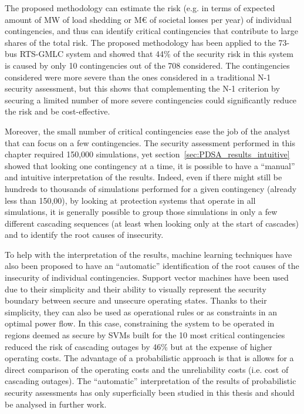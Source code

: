 The proposed methodology can estimate the risk (e.g. in terms of expected amount of MW of load shedding or M€ of societal losses per year) of individual contingencies, and thus can identify critical contingencies that contribute to large shares of the total risk. The proposed methodology has been applied to the 73-bus RTS-GMLC system and showed that 44\% of the security risk in this system is caused by only 10 contingencies out of the 708 considered. The contingencies considered were more severe than the ones considered in a traditional N-1 security assessment, but this shows that complementing the N-1 criterion by securing a limited number of more severe contingencies could significantly reduce the risk and be cost-effective.

Moreover, the small number of critical contingencies ease the job of the analyst that can focus on a few contingencies. The security assessment performed in this chapter required 150,000 simulations, yet section~\ref{sec:PDSA_results_intuitive} showed that looking one contingency at a time, it is possible to have a ``manual'' and intuitive interpretation of the results. Indeed, even if there might still be hundreds to thousands of simulations performed for a given contingency (already less than 150,00), by looking at protection systems that operate in all simulations, it is generally possible to group those simulations in only a few different cascading sequences (at least when looking only at the start of cascades) and to identify the root causes of insecurity.

To help with the interpretation of the results, machine learning techniques have also been proposed to have an ``automatic'' identification of the root causes of the insecurity of individual contingencies. Support vector machines have been used due to their simplicity and their ability to visually represent the security boundary between secure and unsecure operating states. Thanks to their simplicity, they can also be used as operational rules or as constraints in an optimal power flow. In this case, constraining the system to be operated in regions deemed as secure by SVMs built for the 10 most critical contingencies reduced the risk of cascading outages by 46\% but at the expense of higher operating costs. The advantage of a probabilistic approach is that is allows for a direct comparison of the operating costs and the unreliability costs (i.e. cost of cascading outages). The ``automatic'' interpretation of the results of probabilistic security assessments has only superficially been studied in this thesis and should be analysed in further work.

